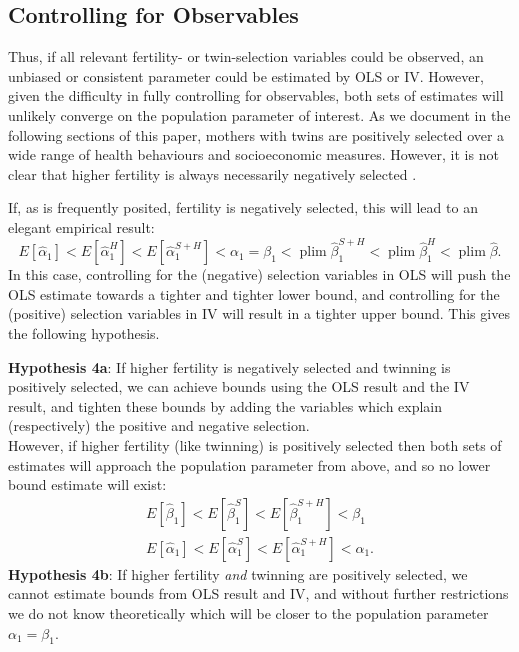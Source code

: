 \documentclass[subeqn]{article}
\DeclareMathOperator{\plim}{plim}
\begin{document}
\begin{spacing}{1.4}
\subsection{Controlling for Observables}
Thus, if all relevant fertility- or twin-selection variables could be observed,
an unbiased or consistent parameter could be estimated by OLS or IV.  However,
given the difficulty in fully controlling for observables, both sets of estimates
will unlikely converge on the population parameter of interest. As we document
in the following sections of this paper, mothers with twins are positively
selected over a wide range of health behaviours and socioeconomic measures.
However, it is not clear that higher fertility is always necessarily negatively
selected \citep{Fortetal2016,Myrskylaetal2009}.

If, as is frequently posited, fertility is negatively selected, this will lead
to an elegant empirical result:
\[
E[\hat\alpha_1] < E[\hat\alpha_1^{H}] < E[\hat\alpha_1^{S+H}] < \alpha_1 =  \beta_1 < \plim\hat\beta_1^{S+H} < \plim\hat\beta_1^{H}<\plim\hat\beta.
\]
In this case, controlling for the (negative) selection variables in OLS will
push the OLS estimate towards a tighter and tighter lower bound, and controlling
for the (positive) selection variables in IV will result in a tighter upper bound.
This gives the following hypothesis.

\noindent \textbf{Hypothesis 4a}: If higher fertility is negatively selected and twinning is positively selected, we can achieve bounds using the OLS result and the IV result, and tighten these bounds by adding the variables which explain (respectively) the positive and negative selection.
\\
However, if higher fertility (like twinning) is positively selected then both
sets of estimates will approach the population parameter from above, and so
no lower bound estimate will exist:
\begin{eqnarray}
  E[\hat\beta_1] < E[\hat\beta_1^{S}] < E[\hat\beta_1^{S+H}] < \beta_1  \nonumber \\
  E[\hat\alpha_1] < E[\hat\alpha_1^{S}] < E[\hat\alpha_1^{S+H}] < \alpha_1. \nonumber
\end{eqnarray}
\noindent \textbf{Hypothesis 4b}: If higher fertility \emph{and} twinning are positively selected, we cannot estimate bounds from OLS result and IV, and without further restrictions we do not know theoretically which will be closer to the population parameter $\alpha_1=\beta_1$.


\end{spacing}
\end{document}
